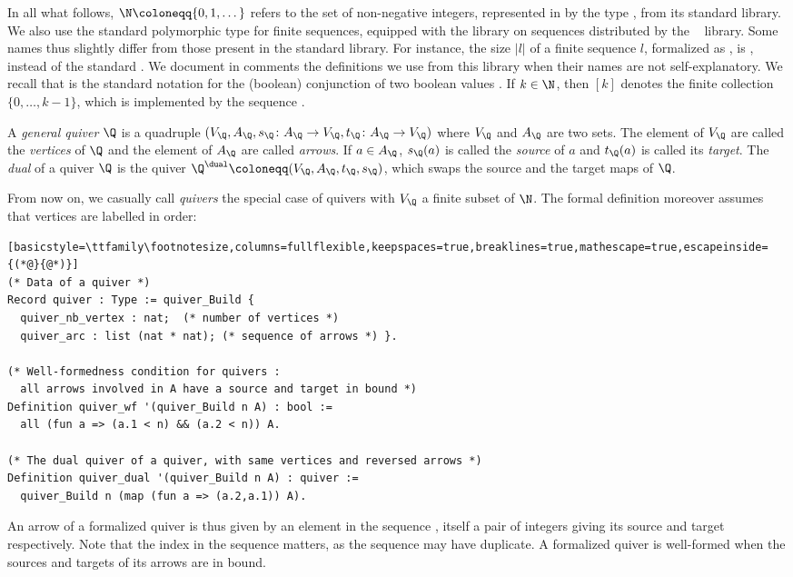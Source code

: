 In all what follows, $\N \coloneqq \{0, 1, \dots \}$ refers to the set of non-negative integers, represented in \Coq{} by the type , from its standard library. We also use the standard polymorphic type  for finite sequences, equipped with the library on sequences distributed by the \MC{}~\cite{assia_mahboubi_2021_4457887} library. Some names thus slightly differ from those present in the standard library. For instance, the size $|l|$ of a finite sequence $l$, formalized as , is , instead of the standard . We document in comments the definitions we use from this library when their names are not self-explanatory. We recall that  is the standard notation for the (boolean) conjunction of two boolean values . If $k\in\N$, then $[k]$ denotes the finite collection $\{0,\dots,k-1\}$, which is implemented by the sequence .

\begin{definition}\label{def:quiv}
  A \emph{general quiver} $\Q$ is a quadruple $(V_\Q, A_\Q, s_\Q\colon A_\Q \to V_\Q, t_\Q\colon A_\Q \to V_\Q)$ where $V_\Q$ and $A_\Q$ are two sets. The element of\/ $V_\Q$ are called the \emph{vertices} of $\Q$ and the element of $A_\Q$ are called \emph{arrows}. If $a \in A_\Q$, $s_\Q(a)$ is called the \emph{source} of $a$ and $t_\Q(a)$ is called its \emph{target}. The \emph{dual} of a quiver $\Q$ is the quiver $\Q^\dual \coloneqq (V_\Q,A_\Q,t_\Q,s_\Q)$, which swaps the source and the target maps of $\Q$.
\end{definition}

From now on, we casually call \emph{quivers} the special case of quivers with $V_\Q$ a finite subset of $\N$. The formal definition moreover assumes that vertices are labelled in order:
\begin{lstlisting}[basicstyle=\ttfamily\footnotesize,columns=fullflexible,keepspaces=true,breaklines=true,mathescape=true,escapeinside={(*@}{@*)}]
(* Data of a quiver *)
Record quiver : Type := quiver_Build {
  quiver_nb_vertex : nat;  (* number of vertices *)
  quiver_arc : list (nat * nat); (* sequence of arrows *) }.

(* Well-formedness condition for quivers :
  all arrows involved in A have a source and target in bound *)
Definition quiver_wf '(quiver_Build n A) : bool :=
  all (fun a => (a.1 < n) && (a.2 < n)) A.

(* The dual quiver of a quiver, with same vertices and reversed arrows *)
Definition quiver_dual '(quiver_Build n A) : quiver :=
  quiver_Build n (map (fun a => (a.2,a.1)) A).
\end{lstlisting}
An arrow of a formalized quiver  is thus given by an element in the sequence , itself a pair of integers giving its source and target respectively. Note that the index in the sequence matters, as the sequence may have duplicate. A formalized quiver is well-formed when the sources and targets of its arrows are in bound.

